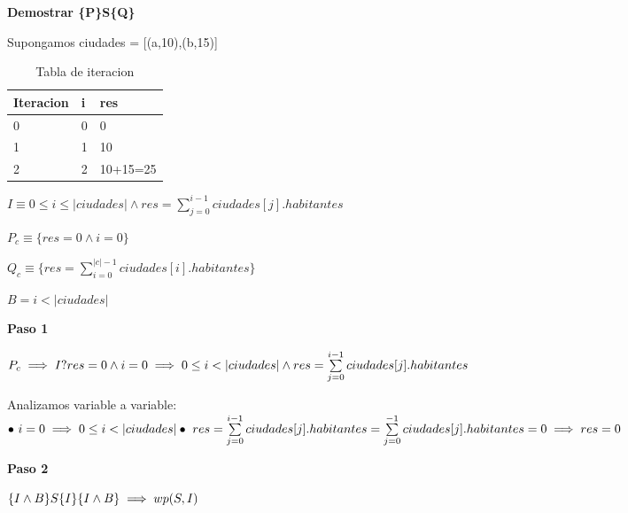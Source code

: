 \documentclass[10pt,a4paper]{article}
\begin{document}
\vspace{0.3cm}

\textbf{Demostrar \{P\}S\{Q\}}

\vspace{0.1cm}

\noindent Supongamos ciudades = [(a,10),(b,15)]

\begin{table}[h!]
	\begin{tabular}{| l | l | l |} 
		\hline
		Iteracion & i & res  \\ [0.5ex] 
		\hline
		0 & 0 & 0 \\ 
		1 & 1 & 10 \\
		2 & 2 & 10+15=25 \\
		\hline
	\end{tabular}
	\captionsetup{singlelinecheck=off}
	\caption{Tabla de iteracion}
	\label{tab:iteracion}
\end{table}

$I \equiv 0 \leq i \leq |ciudades| \wedge res = \sum\limits_{j=0}^{i-1} ciudades[j].habitantes$

$ P_c \equiv \{res = 0 \wedge i = 0\}$

$ Q_c \equiv \{res = \sum\limits_{i=0}^{|c|-1} ciudades[i].habitantes\}$

$ B = i < |ciudades|$

\vspace{0.3cm}

\textbf{Paso 1}

\vspace{0.1cm}

\noindent$P_c \implies I ? \\ res = 0 \wedge i = 0 \implies 0 \leq i < |ciudades| \wedge res = \sum\limits_{j=0}^{i-1} ciudades[j].habitantes$

Analizamos variable a variable: \\ $\bullet \ i = 0 \implies 0 \leq i < |ciudades| \\ \bullet \ res = \sum\limits_{j=0}^{i-1} ciudades[j].habitantes = \sum\limits_{j=0}^{-1} ciudades[j].habitantes = 0 \implies res = 0$

\vspace{0.3cm}

\textbf{Paso 2}

\vspace{0.1cm}

\noindent$\{I \wedge B\} S \{I\} \\ \{I \wedge B\} \implies wp(S,I)$
\end{document}

